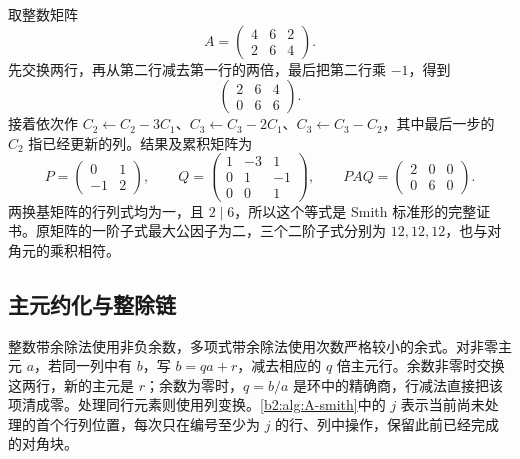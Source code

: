 \begin{example}\label{b2:exm:A-integer-certificate}
	取整数矩阵
	\[
		A=\begin{pmatrix}4&6&2\\2&6&4\end{pmatrix}.
	\]
	先交换两行，再从第二行减去第一行的两倍，最后把第二行乘 \(-1\)，得到
	\[
		\begin{pmatrix}2&6&4\\0&6&6\end{pmatrix}.
	\]
	接着依次作 \(C_2\leftarrow C_2-3C_1\)、\(C_3\leftarrow C_3-2C_1\)、\(C_3\leftarrow C_3-C_2\)，其中最后一步的 \(C_2\) 指已经更新的列。结果及累积矩阵为
	\begin{equation}\label{b2:eq:A-integer-certificate}
		P=\begin{pmatrix}0&1\\-1&2\end{pmatrix},\qquad
		Q=\begin{pmatrix}1&-3&1\\0&1&-1\\0&0&1\end{pmatrix},\qquad
		PAQ=\begin{pmatrix}2&0&0\\0&6&0\end{pmatrix}.
	\end{equation}
	两换基矩阵的行列式均为一，且 \(2\mid6\)，所以这个等式是 Smith 标准形的完整证书。原矩阵的一阶子式最大公因子为二，三个二阶子式分别为 \(12,12,12\)，也与对角元的乘积相符。
\end{example}

\subsection{主元约化与整除链}
\label{b2:subsec:A01:02}

整数带余除法使用非负余数，多项式带余除法使用次数严格较小的余式。对非零主元 \(a\)，若同一列中有 \(b\)，写 \(b=qa+r\)，减去相应的 \(q\) 倍主元行。余数非零时交换这两行，新的主元是 \(r\)；余数为零时，\(q=b/a\) 是环中的精确商，行减法直接把该项清成零。处理同行元素则使用列变换。\cref{b2:alg:A-smith}中的 \(j\) 表示当前尚未处理的首个行列位置，每次只在编号至少为 \(j\) 的行、列中操作，保留此前已经完成的对角块。

